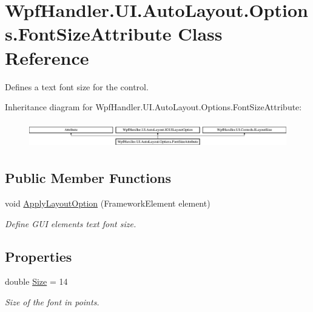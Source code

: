 \hypertarget{class_wpf_handler_1_1_u_i_1_1_auto_layout_1_1_options_1_1_font_size_attribute}{}\section{Wpf\+Handler.\+U\+I.\+Auto\+Layout.\+Options.\+Font\+Size\+Attribute Class Reference}
\label{class_wpf_handler_1_1_u_i_1_1_auto_layout_1_1_options_1_1_font_size_attribute}


Defines a text font size for the control.  


Inheritance diagram for Wpf\+Handler.\+U\+I.\+Auto\+Layout.\+Options.\+Font\+Size\+Attribute\+:\begin{figure}[H]
\begin{center}
\leavevmode
\includegraphics[height=1.177708cm]{d8/d18/class_wpf_handler_1_1_u_i_1_1_auto_layout_1_1_options_1_1_font_size_attribute}
\end{center}
\end{figure}
\subsection*{Public Member Functions}
\begin{DoxyCompactItemize}
\item 
void \mbox{\hyperlink{class_wpf_handler_1_1_u_i_1_1_auto_layout_1_1_options_1_1_font_size_attribute_abd93e70e5419e81c4dfdd9b5d1f35343}{Apply\+Layout\+Option}} (Framework\+Element element)
\begin{DoxyCompactList}\small\item\em Define G\+UI element\textquotesingle{}s text font size. \end{DoxyCompactList}\end{DoxyCompactItemize}
\subsection*{Properties}
\begin{DoxyCompactItemize}
\item 
double \mbox{\hyperlink{class_wpf_handler_1_1_u_i_1_1_auto_layout_1_1_options_1_1_font_size_attribute_a202d0e2cf999904e0a9391cab646bbfc}{Size}} = 14
\begin{DoxyCompactList}\small\item\em Size of the font in points. \end{DoxyCompactList}\end{DoxyCompactItemize}


